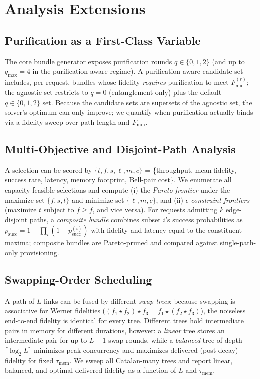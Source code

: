 \documentclass[twocolumn]{article}
\begin{document}
\section{Analysis Extensions}
\label{sec:extensions}

\subsection{Purification as a First-Class Variable}
\label{sec:purification}

The core bundle generator exposes purification rounds $q \in \{0,1,2\}$
(and up to $q_{\max}=4$ in the purification-aware regime).  A
purification-aware candidate set includes, per request, bundles whose
fidelity \emph{requires} purification to meet $F_{\min}^{(r)}$; the
agnostic set restricts to $q=0$ (entanglement-only) plus the default
$q\in\{0,1,2\}$ set.  Because the candidate sets are supersets of the
agnostic set, the solver's optimum can only improve; we quantify when
purification actually binds via a fidelity sweep over path length and
$F_{\min}$.

\subsection{Multi-Objective and Disjoint-Path Analysis}
\label{sec:multiobj}

A selection can be scored by $\{t,f,s,\ell,m,c\}$ = \{throughput, mean
fidelity, success rate, latency, memory footprint, Bell-pair cost\}.
We enumerate all capacity-feasible selections and compute (i) the
\emph{Pareto frontier} under the maximize set $\{f,s,t\}$ and minimize
set $\{\ell,m,c\}$, and (ii) \emph{$\epsilon$-constraint frontiers}
(maximize $t$ subject to $f \ge \bar f$, and vice versa).  For requests
admitting $k$ edge-disjoint paths, a \emph{composite bundle} combines
subset $i$'s success probabilities as
$p_{\text{succ}} = 1 - \prod_i (1 - p_{\text{succ}}^{(i)})$ with
fidelity and latency equal to the constituent maxima; composite
bundles are Pareto-pruned and compared against single-path-only
provisioning.

\subsection{Swapping-Order Scheduling}
\label{sec:swapping}

A path of $L$ links can be fused by different \emph{swap trees};
because swapping is associative for Werner fidelities
($(f_1 \star f_2) \star f_3 = f_1 \star (f_2 \star f_3)$), the
noiseless end-to-end fidelity is identical for every tree.  Different
trees hold intermediate pairs in memory for different durations,
however: a \emph{linear} tree stores an intermediate pair for up to
$L-1$ swap rounds, while a \emph{balanced} tree of depth
$\lceil\log_2 L\rceil$ minimizes peak concurrency and maximizes
delivered (post-decay) fidelity for fixed $\tau_{\text{mem}}$.  We
sweep all Catalan-many trees and report linear, balanced, and optimal
delivered fidelity as a function of $L$ and $\tau_{\text{mem}}$.
\end{document}
